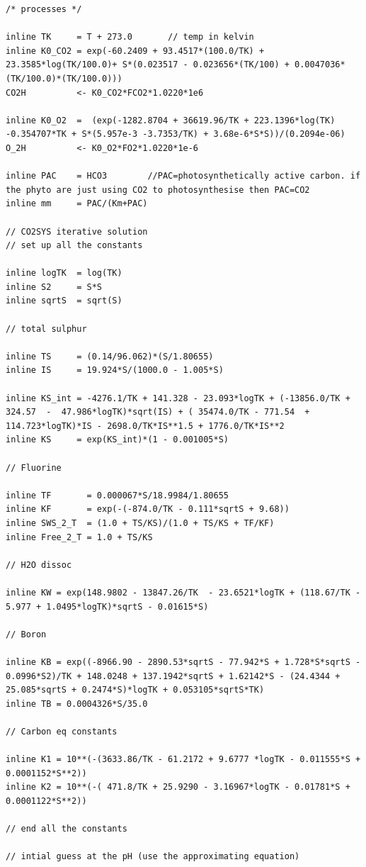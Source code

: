 \documentclass{ruthesis}
\begin{document}
\begin{verbatim}
/* processes */

inline TK     = T + 273.0		// temp in kelvin
inline K0_CO2 = exp(-60.2409 + 93.4517*(100.0/TK) + 23.3585*log(TK/100.0)+ S*(0.023517 - 0.023656*(TK/100) + 0.0047036*(TK/100.0)*(TK/100.0)))
CO2H          <- K0_CO2*FCO2*1.0220*1e6

inline K0_O2  =  (exp(-1282.8704 + 36619.96/TK + 223.1396*log(TK) -0.354707*TK + S*(5.957e-3 -3.7353/TK) + 3.68e-6*S*S))/(0.2094e-06)
O_2H 	      <- K0_O2*FO2*1.0220*1e-6

inline PAC    = HCO3  		//PAC=photosynthetically active carbon. if the phyto are just using CO2 to photosynthesise then PAC=CO2
inline mm     = PAC/(Km+PAC)

// CO2SYS iterative solution
// set up all the constants

inline logTK  = log(TK)
inline S2     = S*S
inline sqrtS  = sqrt(S)

// total sulphur

inline TS     = (0.14/96.062)*(S/1.80655)
inline IS     = 19.924*S/(1000.0 - 1.005*S)

inline KS_int = -4276.1/TK + 141.328 - 23.093*logTK + (-13856.0/TK + 324.57  -  47.986*logTK)*sqrt(IS) + ( 35474.0/TK - 771.54  + 114.723*logTK)*IS - 2698.0/TK*IS**1.5 + 1776.0/TK*IS**2
inline KS     = exp(KS_int)*(1 - 0.001005*S)

// Fluorine

inline TF       = 0.000067*S/18.9984/1.80655
inline KF       = exp(-(-874.0/TK - 0.111*sqrtS + 9.68))
inline SWS_2_T  = (1.0 + TS/KS)/(1.0 + TS/KS + TF/KF)
inline Free_2_T = 1.0 + TS/KS

// H2O dissoc

inline KW = exp(148.9802 - 13847.26/TK  - 23.6521*logTK + (118.67/TK - 5.977 + 1.0495*logTK)*sqrtS - 0.01615*S)

// Boron

inline KB = exp((-8966.90 - 2890.53*sqrtS - 77.942*S + 1.728*S*sqrtS - 0.0996*S2)/TK + 148.0248 + 137.1942*sqrtS + 1.62142*S - (24.4344 + 25.085*sqrtS + 0.2474*S)*logTK + 0.053105*sqrtS*TK)
inline TB = 0.0004326*S/35.0

// Carbon eq constants

inline K1 = 10**(-(3633.86/TK - 61.2172 + 9.6777 *logTK - 0.011555*S + 0.0001152*S**2))
inline K2 = 10**(-( 471.8/TK + 25.9290 - 3.16967*logTK - 0.01781*S + 0.0001122*S**2))

// end all the constants

// intial guess at the pH (use the approximating equation)


\end{verbatim}
\end{document}
